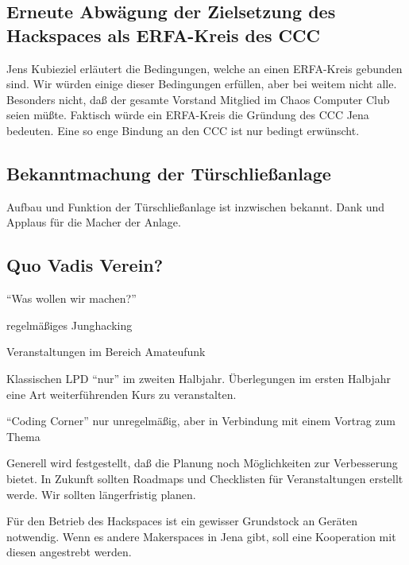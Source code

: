 \documentclass[]{scrartcl}
\newenvironment{packed_item}{
\begin{itemize}
\setlength{\itemsep}{-5pt}
\setlength{\parsep}{0pt}
}{\end{itemize}}
\newcommand{\qbi}{Jens Kubieziel}
\begin{document}
\begin{multicols}{2}
\subsection{Erneute Abwägung der Zielsetzung des Hackspaces als ERFA-Kreis des
CCC}
\qbi{} erläutert die Bedingungen, welche an einen ERFA-Kreis gebunden sind. Wir
würden einige dieser Bedingungen erfüllen, aber bei weitem nicht alle.
Besonders nicht, daß der gesamte Vorstand Mitglied im Chaos Computer Club seien
müßte. Faktisch würde ein ERFA-Kreis die Gründung des CCC Jena bedeuten.
Eine so enge Bindung an den CCC ist nur bedingt erwünscht.

\subsection{Bekanntmachung der Türschließanlage}
Aufbau und Funktion der Türschließanlage ist inzwischen bekannt. Dank und
Applaus für die Macher der Anlage.
    
\subsection{Quo Vadis Verein?}
\enquote{Was wollen wir machen?}
\begin{packed_item}
\item regelmäßiges Junghacking
\item Veranstaltungen im Bereich Amateufunk
\item Klassischen LPD \enquote{nur} im zweiten Halbjahr. Überlegungen im ersten
Halbjahr eine Art weiterführenden Kurs zu veranstalten.
\item \enquote{Coding Corner} nur unregelmäßig, aber in Verbindung mit
einem Vortrag zum Thema
\end{packed_item}
Generell wird festgestellt, daß die Planung noch Möglichkeiten zur
Verbesserung bietet. In Zukunft sollten Roadmaps und Checklisten für
Veranstaltungen erstellt werde. Wir sollten längerfristig planen.

Für den Betrieb des Hackspaces ist ein gewisser Grundstock an Geräten
notwendig. Wenn es andere Makerspaces in Jena gibt, soll eine Kooperation
mit diesen angestrebt werden.


\end{multicols}
\end{document}
